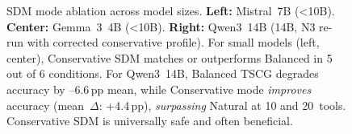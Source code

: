 \begin{figure}[t]
\begin{minipage}[t]{0.32\textwidth}
\end{minipage}
\caption{SDM mode ablation across model sizes. \textbf{Left:} Mistral~7B ({<}10B). \textbf{Center:} Gemma~3~4B ({<}10B). \textbf{Right:} Qwen3~14B (14B, N3 re-run with corrected conservative profile). For small models (left, center), Conservative SDM matches or outperforms Balanced in 5 out of 6 conditions. For Qwen3~14B, Balanced TSCG degrades accuracy by {--}6.6\,pp mean, while Conservative mode \emph{improves} accuracy (mean~$\Delta$: {+}4.4\,pp), \emph{surpassing} Natural at 10 and 20~tools. Conservative SDM is universally safe and often beneficial.}
\label{fig:sdm-ablation}
\end{figure}
